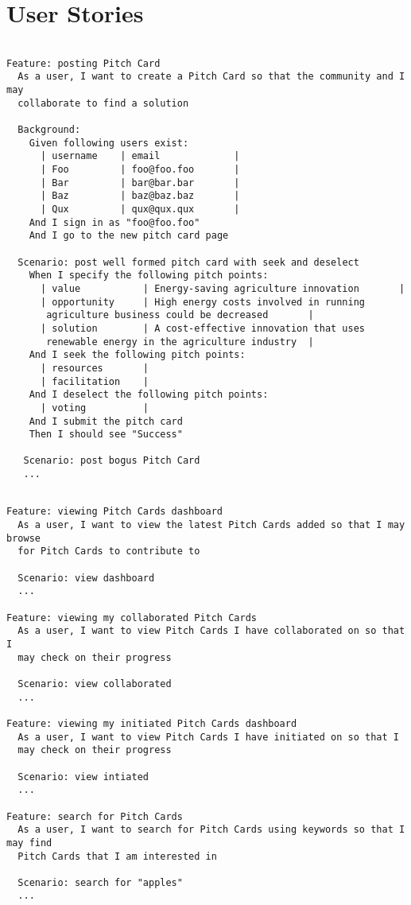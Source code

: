 \appendix
\chapter{User Stories}\label{A:user_stories}

\begin{verbatim}

Feature: posting Pitch Card
  As a user, I want to create a Pitch Card so that the community and I may
  collaborate to find a solution

  Background:
    Given following users exist:
      | username    | email             |
      | Foo	        | foo@foo.foo       |
      | Bar      	| bar@bar.bar       |
      | Baz      	| baz@baz.baz       |
      | Qux      	| qux@qux.qux       |
    And I sign in as "foo@foo.foo"
    And I go to the new pitch card page

  Scenario: post well formed pitch card with seek and deselect
    When I specify the following pitch points:
      | value	        | Energy-saving agriculture innovation       |
      | opportunity     | High energy costs involved in running
       agriculture business could be decreased       |
      | solution        | A cost-effective innovation that uses
       renewable energy in the agriculture industry  |
    And I seek the following pitch points:
      | resources       |
      | facilitation    |
    And I deselect the following pitch points:
      | voting          |
    And I submit the pitch card
    Then I should see "Success"

   Scenario: post bogus Pitch Card
   ...

\end{verbatim}

\begin{verbatim}

Feature: viewing Pitch Cards dashboard
  As a user, I want to view the latest Pitch Cards added so that I may browse
  for Pitch Cards to contribute to

  Scenario: view dashboard
  ...

Feature: viewing my collaborated Pitch Cards
  As a user, I want to view Pitch Cards I have collaborated on so that I 
  may check on their progress

  Scenario: view collaborated
  ...

Feature: viewing my initiated Pitch Cards dashboard
  As a user, I want to view Pitch Cards I have initiated on so that I 
  may check on their progress

  Scenario: view intiated
  ...

Feature: search for Pitch Cards
  As a user, I want to search for Pitch Cards using keywords so that I may find
  Pitch Cards that I am interested in

  Scenario: search for "apples"
  ...

\end{verbatim}

